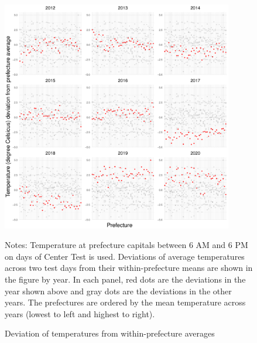 \documentclass[12pt,letterpaper]{article}
\begin{document}
\begin{figure}[H]
  \centering
  \caption{Deviation of temperatures from within-prefecture averages}
  \includegraphics[width = 0.9\textwidth]{../Output/images/temperature_diff_by_year.pdf}
  \label{fig:temperature_diff_by_year}
  \footnotesize
  \begin{tablenotes}
    \item Notes:
      Temperature at prefecture capitals between 6 AM and 6 PM on days of Center Test is used.
      Deviations of average temperatures across two test days from their within-prefecture means are shown in the figure by year.
      In each panel, red dots are the deviations in the year shown above and gray dots are the deviations in the other years.
      The prefectures are ordered by the mean temperature across years (lowest to left and highest to right).
  \end{tablenotes}
\end{figure}
\end{document}
